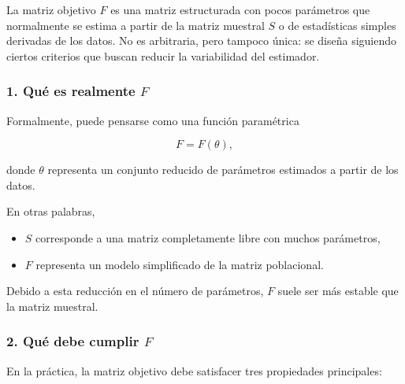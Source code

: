\documentclass[letterpaper,12pt,oneside]{book}
\begin{document}
La matriz objetivo $F$ es una matriz estructurada con pocos parámetros que normalmente se estima a partir de la matriz muestral $S$ o de estadísticas simples derivadas de los datos. No es arbitraria, pero tampoco única: se diseña siguiendo ciertos criterios que buscan reducir la variabilidad del estimador.

\subsubsection*{1. Qué es realmente $F$}

Formalmente, puede pensarse como una función paramétrica

\[
F = F(\theta),
\]

donde $\theta$ representa un conjunto reducido de parámetros estimados a partir de los datos.

En otras palabras,

\begin{itemize}
\item $S$ corresponde a una matriz completamente libre con muchos parámetros,
\item $F$ representa un modelo simplificado de la matriz poblacional.
\end{itemize}

Debido a esta reducción en el número de parámetros, $F$ suele ser más estable que la matriz muestral.

\subsubsection*{2. Qué debe cumplir $F$}

En la práctica, la matriz objetivo debe satisfacer tres propiedades principales:
\end{document}
